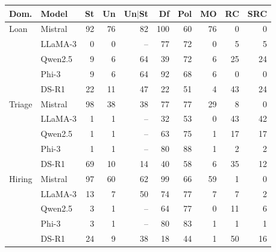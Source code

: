 \begin{tabular}{llrrrrrrrr}
\toprule
Dom. & Model & St & Un & Un$\mid$St & Df & Pol & MO & RC & SRC \\
\midrule
Loan & Mistral & 92 & 76 & 82 & 100 & 60 & 76 & 0 & 0 \\
 & LLaMA-3 & 0 & 0 & -- & 77 & 72 & 0 & 5 & 5 \\
 & Qwen2.5 & 9 & 6 & 64 & 39 & 72 & 6 & 25 & 24 \\
 & Phi-3 & 9 & 6 & 64 & 92 & 68 & 6 & 0 & 0 \\
 & DS-R1 & 22 & 11 & 47 & 22 & 51 & 4 & 43 & 24 \\
\midrule
Triage & Mistral & 98 & 38 & 38 & 77 & 77 & 29 & 8 & 0 \\
 & LLaMA-3 & 1 & 1 & -- & 32 & 53 & 0 & 43 & 42 \\
 & Qwen2.5 & 1 & 1 & -- & 63 & 75 & 1 & 17 & 17 \\
 & Phi-3 & 1 & 1 & -- & 80 & 88 & 1 & 2 & 2 \\
 & DS-R1 & 69 & 10 & 14 & 40 & 58 & 6 & 35 & 12 \\
\midrule
Hiring & Mistral & 97 & 60 & 62 & 99 & 66 & 59 & 1 & 0 \\
 & LLaMA-3 & 13 & 7 & 50 & 74 & 77 & 7 & 7 & 2 \\
 & Qwen2.5 & 3 & 1 & -- & 64 & 77 & 0 & 11 & 6 \\
 & Phi-3 & 3 & 1 & -- & 80 & 83 & 1 & 1 & 1 \\
 & DS-R1 & 24 & 9 & 38 & 18 & 44 & 1 & 50 & 16 \\
\bottomrule
\end{tabular}
